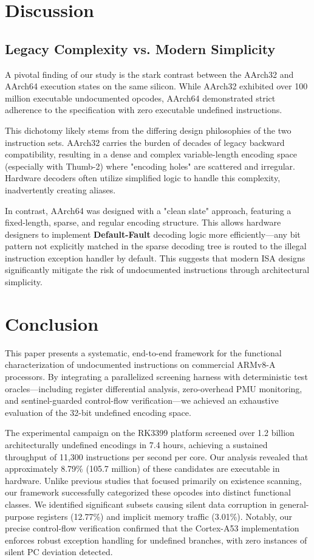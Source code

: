 \documentclass[pdflatex,sn-mathphys]{sn-jnl}%
\theoremstyle{thmstyleone}%
\theoremstyle{thmstyletwo}%
\theoremstyle{thmstylethree}%
\begin{document}
\section{Discussion}\label{sec:discuss}

\subsection{Legacy Complexity vs. Modern Simplicity}
A pivotal finding of our study is the stark contrast between the AArch32 and AArch64 execution states on the same silicon. While AArch32 exhibited over 100 million executable undocumented opcodes, AArch64 demonstrated strict adherence to the specification with zero executable undefined instructions.

This dichotomy likely stems from the differing design philosophies of the two instruction sets. AArch32 carries the burden of decades of legacy backward compatibility, resulting in a dense and complex variable-length encoding space (especially with Thumb-2) where "encoding holes" are scattered and irregular. Hardware decoders often utilize simplified logic to handle this complexity, inadvertently creating aliases. 

In contrast, AArch64 was designed with a "clean slate" approach, featuring a fixed-length, sparse, and regular encoding structure. This allows hardware designers to implement \textbf{Default-Fault} decoding logic more efficiently—any bit pattern not explicitly matched in the sparse decoding tree is routed to the illegal instruction exception handler by default. This suggests that modern ISA designs significantly mitigate the risk of undocumented instructions through architectural simplicity.

\section{Conclusion}\label{sec:conc}

This paper presents a systematic, end-to-end framework for the functional characterization of undocumented instructions on commercial ARMv8-A processors. By integrating a parallelized screening harness with deterministic test oracles—including register differential analysis, zero-overhead PMU monitoring, and sentinel-guarded control-flow verification—we achieved an exhaustive evaluation of the 32-bit undefined encoding space.

The experimental campaign on the RK3399 platform screened over 1.2 billion architecturally undefined encodings in 7.4 hours, achieving a sustained throughput of 11,300 instructions per second per core. Our analysis revealed that approximately 8.79\% (105.7 million) of these candidates are executable in hardware. Unlike previous studies that focused primarily on existence scanning, our framework successfully categorized these opcodes into distinct functional classes. We identified significant subsets causing silent data corruption in general-purpose registers (12.77\%) and implicit memory traffic (3.01\%). Notably, our precise control-flow verification confirmed that the Cortex-A53 implementation enforces robust exception handling for undefined branches, with zero instances of silent PC deviation detected.
\end{document}
